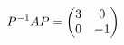 \documentclass[preview]{standalone}
\begin{document}
\begin{align*}
\special{dvisvgm:raw <g id='unique000'>}P^{-1}AP=\begin{pmatrix}3&0\\0&-1\end{pmatrix}\special{dvisvgm:raw </g>}
\end{align*}
\end{document}

